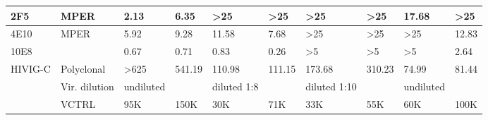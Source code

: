 \begin{table*}[h!]
{\begin{tabular}{l|l|l|l|l|l|l|l|l|l|}
			\multicolumn{1}{|l|}{2F5}     & MPER          & \cellcolor[HTML]{C0C0C0}2.13 & \cellcolor[HTML]{C0C0C0}6.35 & \textgreater{}25               & \textgreater{}25               & \textgreater{}25               & \textgreater{}25                         & \cellcolor[HTML]{C0C0C0}17.68 & \cellcolor[HTML]{C0C0C0}\textgreater{}25 \\ \hline
			\multicolumn{1}{|l|}{4E10}    & MPER          & \cellcolor[HTML]{C0C0C0}5.92 & \cellcolor[HTML]{C0C0C0}9.28 & 11.58                          & 7.68                           & \textgreater{}25               & \textgreater{}25                         & \textgreater{}25              & 12.83                                    \\ \hline
			\multicolumn{1}{|l|}{10E8}    &               & 0.67 &0.71 & 0.83                           & 0.26                           & \textgreater{}5                & \textgreater{}5                          & \textgreater{}5               & 2.64                                     \\ \hline
			\multicolumn{1}{|l|}{HIVIG-C} & Polyclonal    & \textgreater{}625            & 541.19                       & \cellcolor[HTML]{C0C0C0}110.98 & \cellcolor[HTML]{C0C0C0}111.15 & \cellcolor[HTML]{C0C0C0}173.68 & \cellcolor[HTML]{C0C0C0}310.23           & \cellcolor[HTML]{C0C0C0}74.99 & \cellcolor[HTML]{C0C0C0}81.44            \\ \hline
			& Vir. dilution & undiluted                    &                              & diluted 1:8                    &                                & diluted 1:10                   &                                          & undiluted                     &                                          \\ \cline{2-10} 
			& VCTRL         & 95K                          & 150K                         & 30K                            & 71K                            & 33K                            & 55K                                      & 60K                           & 100K                                     \\ \cline{2-10} 
		\end{tabular}%
	}
\end{table*}



